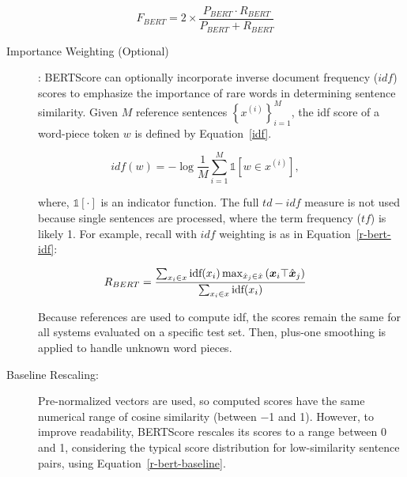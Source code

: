 {{    \begin{equation} \label{f-bert}
    F_{BERT} = 2 \times \frac{P_{BERT} \cdot R_{BERT}}{P_{BERT} + R_{BERT}}
    \end{equation}
    
\begin{description}     
    \item[Importance Weighting (Optional)]: BERTScore can optionally incorporate inverse document frequency ($idf$) scores to emphasize the importance of rare words in determining sentence similarity. Given $M$ reference sentences $\left\{{x^{(i)}} \right\}_{i=1}^{M}$, the idf score of a word-piece token $w$ is defined by Equation~\ref{idf}.
\end{description} 

    \begin{equation} \label{idf}
    idf(w) = - \log \frac{1}{M} \sum_{i=1}^{M} \mathds{1} [w∈x^{(i)}],
    \end{equation}

\begin{description}    
    \item[\hspace{=2em}]where, $\mathds{1}[\cdot]$ is an indicator function. The full $td-idf$ measure is not used because single sentences are processed, where the term frequency ($tf$) is likely 1. For example, recall with $idf$ weighting is as in Equation~\ref{r-bert-idf}:
\end{description}

    \begin{equation} \label{r-bert-idf}
     R_{BERT} = \frac{\sum_{x_i \in x} \text{idf}(x_i) \max_{\hat{x}_j \in \hat{x}} \left( \boldsymbol{x}_i \top \hat{\boldsymbol{x}}_j \right) }{\sum_{x_i \in x} \text{idf}(x_i)} \\
    \end{equation}
    
\begin{description}    
    \item[\hspace{=2em}]Because references are used to compute idf, the scores remain the same for all systems evaluated on a specific test set. Then, plus-one smoothing is applied to handle unknown word pieces.
\end{description}
    
\begin{description}    
    \item[Baseline Rescaling:] Pre-normalized vectors are used, so computed scores have the same numerical range of cosine similarity (between −1 and 1). However, to improve readability, BERTScore rescales its scores to a range between 0 and 1, considering the typical score distribution for low-similarity sentence pairs, using Equation~\ref{r-bert-baseline}.
\end{description}    

}}
